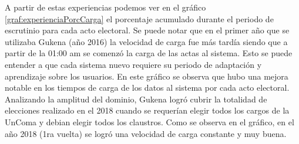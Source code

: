 A partir de estas experiencias podemos ver en el gráfico \ref{graf:experienciaPorcCarga} el porcentaje acumulado durante el periodo de escrutinio para cada acto electoral.  \newline
Se puede notar que en el primer año que se utilizaba Gukena (año 2016) la velocidad de carga fue más tardía siendo que a partir de la 01:00 am se comenzó la carga de las actas al sistema. Esto se puede entender a que cada sistema nuevo requiere su periodo de adaptación y aprendizaje sobre los usuarios. En este gráfico se observa que hubo una mejora notable en los tiempos de carga de los datos al sistema por cada acto electoral. Analizando la amplitud del dominio, Gukena logró cubrir la totalidad de elecciones realizado en el 2018 cuando se requerían elegir todos los cargos de la UnComa y debian elegir todos los claustros. Como se observa en el gráfico, en el año 2018 (1ra vuelta) se logró una velocidad de carga constante y muy buena.
